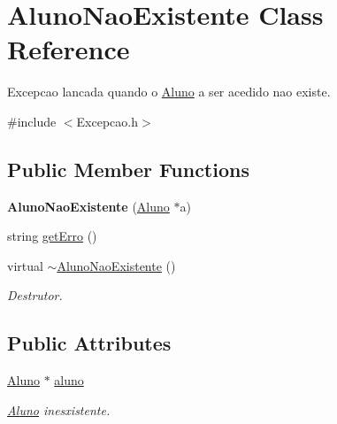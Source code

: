 \hypertarget{class_aluno_nao_existente}{\section{Aluno\-Nao\-Existente Class Reference}
\label{class_aluno_nao_existente}
}


Excepcao lancada quando o \hyperlink{class_aluno}{Aluno} a ser acedido nao existe.  




{\ttfamily \#include $<$Excepcao.\-h$>$}

\subsection*{Public Member Functions}
\begin{DoxyCompactItemize}
\item 
\hypertarget{class_aluno_nao_existente_a5ad5fa0f402f1bec2b88b698cf3f5928}{{\bfseries Aluno\-Nao\-Existente} (\hyperlink{class_aluno}{Aluno} $\ast$a)}\label{class_aluno_nao_existente_a5ad5fa0f402f1bec2b88b698cf3f5928}

\item 
string \hyperlink{class_aluno_nao_existente_aacfbce6e5c3fba7f14cdfe4588d9f3fc}{get\-Erro} ()
\item 
\hypertarget{class_aluno_nao_existente_a72857c8ba816dbec308567382904e14b}{virtual \hyperlink{class_aluno_nao_existente_a72857c8ba816dbec308567382904e14b}{$\sim$\-Aluno\-Nao\-Existente} ()}\label{class_aluno_nao_existente_a72857c8ba816dbec308567382904e14b}

\begin{DoxyCompactList}\small\item\em Destrutor. \end{DoxyCompactList}\end{DoxyCompactItemize}
\subsection*{Public Attributes}
\begin{DoxyCompactItemize}
\item 
\hypertarget{class_aluno_nao_existente_a094d853c6593f3b82363171adbcd2158}{\hyperlink{class_aluno}{Aluno} $\ast$ \hyperlink{class_aluno_nao_existente_a094d853c6593f3b82363171adbcd2158}{aluno}}\label{class_aluno_nao_existente_a094d853c6593f3b82363171adbcd2158}

\begin{DoxyCompactList}\small\item\em \hyperlink{class_aluno}{Aluno} inesxistente. \end{DoxyCompactList}\end{DoxyCompactItemize}


